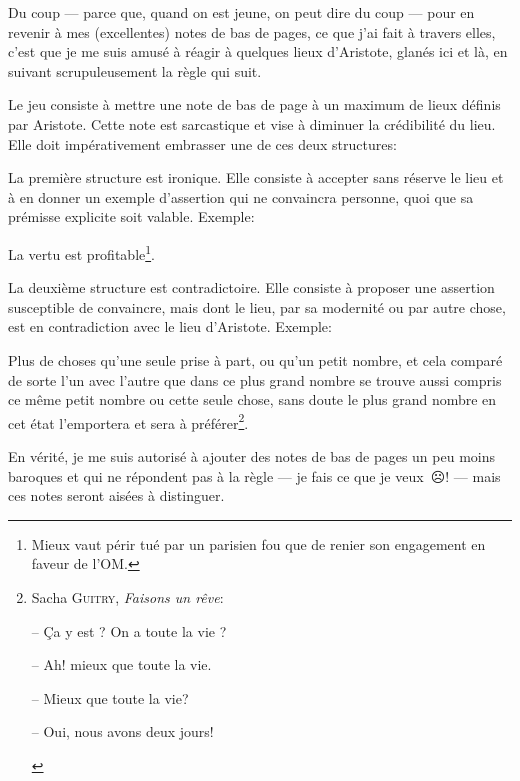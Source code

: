 Du coup --- parce que, quand on est jeune, on peut dire du coup --- pour en revenir à mes (excellentes) notes de bas
de pages, ce que j'ai fait à travers elles, c'est que je me suis amusé à réagir à quelques lieux d'Aristote, glanés
ici et là, en suivant scrupuleusement la règle qui suit.

\bigbreak

Le jeu consiste à mettre une note de bas de page à un maximum de lieux définis par Aristote. Cette note est sarcastique
et vise à diminuer la crédibilité du lieu. Elle doit impérativement embrasser une de ces deux structures:

La première structure est ironique. Elle consiste à accepter sans réserve le lieu et à en donner un exemple d'assertion
qui ne convaincra personne, quoi que sa prémisse explicite soit valable. Exemple:

\begin{emphpar}
	La vertu est profitable\footnote{Mieux vaut périr tué par un parisien fou que de renier son engagement en faveur de
	l'OM.}.
\end{emphpar}

La deuxième structure est contradictoire. Elle consiste à proposer une assertion susceptible de convaincre, mais dont le
lieu, par sa modernité ou par autre chose, est en contradiction avec le lieu d'Aristote. Exemple:

\begin{emphpar}

	Plus de choses qu'une seule prise à part, ou qu'un petit nombre, et cela comparé de sorte l'un avec l'autre
	que dans ce plus grand nombre se trouve aussi compris ce même petit nombre ou cette seule chose, sans doute le plus
	grand nombre en cet état l'emportera et sera à préférer\footnote{Sacha \textsc{Guitry}, \emph{Faisons un rêve}:
	\begin{emphpar}\normalfont
	-- Ça y est ? On a toute la vie ?

	-- Ah! mieux que toute la vie.

	-- Mieux que toute la vie?

	-- Oui, nous avons deux jours!
	\end{emphpar}}.
\end{emphpar}

\newfontfamily{}

En vérité, je me suis autorisé à ajouter des notes de bas de pages un peu moins baroques et qui ne répondent pas à
la règle --- je fais ce que je veux~{\DejaSans ☹}! --- mais ces notes seront aisées à distinguer.

